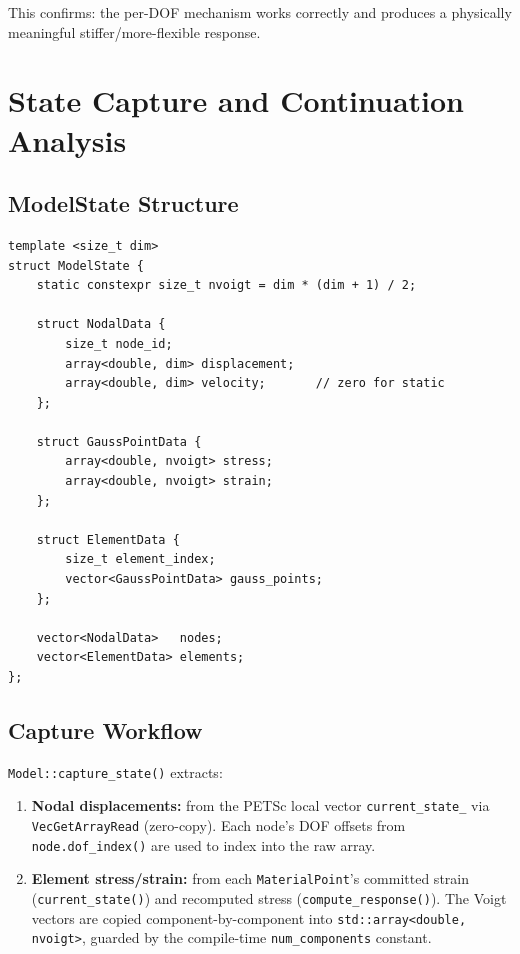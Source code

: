 \noindent
This confirms: the per-DOF mechanism works correctly and produces a
physically meaningful stiffer/more-flexible response.


\section{State Capture and Continuation Analysis}
\label{sec:bc-state}

\subsection{ModelState Structure}

\begin{lstlisting}
template <size_t dim>
struct ModelState {
    static constexpr size_t nvoigt = dim * (dim + 1) / 2;

    struct NodalData {
        size_t node_id;
        array<double, dim> displacement;
        array<double, dim> velocity;       // zero for static
    };

    struct GaussPointData {
        array<double, nvoigt> stress;
        array<double, nvoigt> strain;
    };

    struct ElementData {
        size_t element_index;
        vector<GaussPointData> gauss_points;
    };

    vector<NodalData>   nodes;
    vector<ElementData> elements;
};
\end{lstlisting}

\subsection{Capture Workflow}

\texttt{Model::capture\_state()} extracts:
\begin{enumerate}[nosep]
  \item \textbf{Nodal displacements:}  from the PETSc local vector
        \texttt{current\_state\_} via \texttt{VecGetArrayRead} (zero-copy).
        Each node's DOF offsets from \texttt{node.dof\_index()} are used to
        index into the raw array.
  \item \textbf{Element stress/strain:}  from each \texttt{MaterialPoint}'s
        committed strain (\texttt{current\_state()}) and recomputed stress
        (\texttt{compute\_response()}).  The Voigt vectors are copied
        component-by-component into \texttt{std::array<double, nvoigt>},
        guarded by the compile-time \texttt{num\_components} constant.
\end{enumerate}

